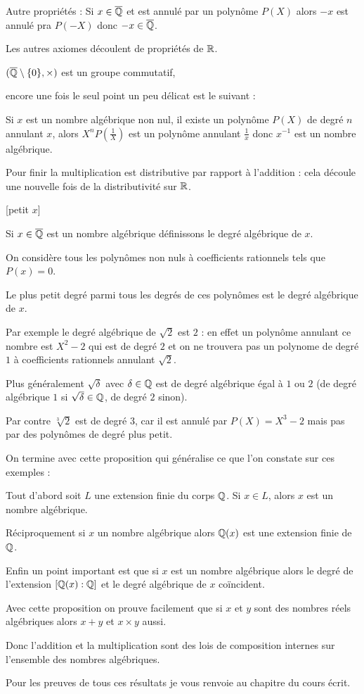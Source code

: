\change 
Autre propriétés : 
Si $x\in \overline{\mathbb{Q}}$ et est annulé par un polynôme $P(X)$
alors $-x$ est annulé pra $P(-X)$ donc $-x \in \overline{\mathbb{Q}}$.

Les autres axiomes découlent de propriétés de $\mathbb{R}$.


\change 
$(\overline{\mathbb{Q}}\setminus\{0\},\times)$ est un groupe commutatif, 

encore une fois le seul point un peu délicat est le suivant :

\change     
Si $x$ est un nombre algébrique non nul, il existe un polynôme $P(X)$ de degré $n$ annulant $x$, 
 alors $X^nP(\frac{1}{X})$ est un polynôme annulant $\frac 1 x$ donc 
 $x^{-1}$ est un nombre algébrique.
 
 \change
 Pour finir la multiplication est distributive par rapport à l'addition 
 : cela découle une nouvelle fois de la distributivité sur $\mathbb{R}$.
 
 
\diapo

[petit $x$]

Si $x \in \overline{\mathbb{Q}}$ est un nombre algébrique définissons le degré algébrique de $x$.

On considère tous les polynômes non nuls à coefficients rationnels  tels que $P(x)=0$.

Le plus petit degré parmi tous les degrés de ces polynômes est le degré algébrique de $x$.


\change
Par exemple le degré algébrique de $\sqrt 2$ est $2$ :
en effet un polynôme annulant ce nombre est $X^2-2$ qui est de degré $2$
et on ne trouvera pas un polynome de degré $1$ à coefficients rationnels annulant $\sqrt 2$.

\change
Plus généralement $\sqrt \delta$ avec $\delta \in \mathbb{Q}$
est de degré algébrique égal à $1$ ou $2$ 
(de degré algébrique $1$ si $\sqrt{\delta} \in \mathbb{Q}$, de degré $2$ sinon).

\change
Par contre $\sqrt[3]{2}$ est de degré $3$, car il est annulé par $P(X) = X^3-2$ 
mais pas par des polynômes de degré plus petit.

\change
On termine avec cette proposition qui généralise ce que l'on constate sur ces exemples :

Tout d'abord soit $L$ une extension finie du corps $\mathbb{Q}$. Si $x\in L$, alors $x$ est un nombre algébrique.

\change
Réciproquement si $x$ un nombre algébrique alors $\mathbb{Q}(x)$ est une extension finie de $\mathbb{Q}$.

\change
Enfin un point important est que si $x$ est un nombre algébrique alors le degré de l'extension 
$[\mathbb{Q}(x):\mathbb{Q}]$ et le degré algébrique de $x$ coïncident.

\change
Avec cette proposition on prouve facilement que si
$x$ et $y$ sont des nombres réels algébriques alors $x+y$ et $x\times y$ aussi.

Donc l'addition et la multiplication sont des lois de composition internes 
sur l'ensemble des nombres algébriques.


Pour les preuves de tous ces résultats je vous renvoie au chapitre du cours écrit.



